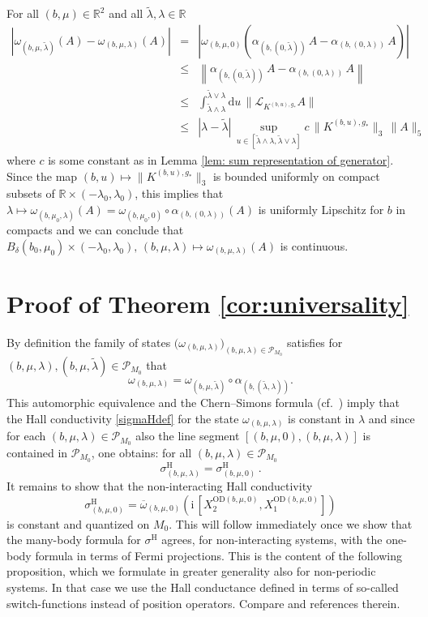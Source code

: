 \documentclass[a4paper]{article}
\newcommand{\D}{\mathrm{d}}
\renewcommand{\i}{\mathrm{i}}
\newcommand{\w}{\omega}
\newcommand{\R}{\mathbb{R}}
\newcommand{\OD}[1][]{   ^{\mathrm{OD}#1}   }
\newcommand{\mL}{\mathcal{L}}
\newcommand{\mP}{\mathcal{P}}
\theoremstyle{plain}
\theoremstyle{definition}
\theoremstyle{remark}
\renewcommand{\(}{\left(}
\renewcommand{\)}{\right)}
\begin{document}
For all $(b,\mu) \in \R^2$ and all $\tilde{\lambda}, \lambda \in \R$ 
\begin{eqnarray*}
|\w_{(b,\mu,\tilde \lambda)}(A)-  \w_{(b,\mu,\lambda)}(A)| &=&
\left|\w_{(b,\mu,0)}\left(\alpha_{(b,(0,\tilde \lambda))}\,A-\alpha_{(b,(0, \lambda))}\,A \right)\right|\\
&\leq& \left\|\alpha_{(b,(0,\tilde \lambda))}\,A-\alpha_{(b,(0,\lambda))}\,A\right\|\\
&\leq & \int_{\tilde\lambda\land \lambda}^{\tilde\lambda\lor \lambda} \D u\, \|\mL_{K^{(b,u),g_*}} A\|
\\
&\leq&
|\lambda-\tilde\lambda|\, \sup_{u\in [\tilde\lambda\land \lambda, \tilde\lambda\lor \lambda]} c\,\|K^{(b,u),g_*}\|_{3}\,\|A\|_{5}
\end{eqnarray*}
where $c$ is some constant as in Lemma \ref{lem: sum representation of generator}.
Since the map $(b,u)\mapsto \|K^{(b,u),g_*}\|_{3}$ is bounded uniformly on compact subsets of $\R\times (-\lambda_0,\lambda_0)$, this implies that $\lambda\mapsto \w_{(b,\mu_0,\lambda)}(A)= \w_{(b,\mu_0,0)}\circ \alpha_{(b,(0,\lambda))}(A)$ is uniformly Lipschitz for $b$ in compacts and we can conclude that  $B_\delta(b_0,\mu_0)\times (-\lambda_0,\lambda_0),\, (b,\mu,\lambda)\mapsto \w_{(b,\mu,\lambda)}(A)$ is continuous.
 

\section{Proof of Theorem \ref{cor:universality}} \label{sec:universality}
 
By definition the family of states $\big(\w_{(b,\mu,\lambda)}\big)_{(b,\mu,\lambda)\in\mathcal{P}_{M_0}}$ satisfies for $(b,\mu,\lambda),(b,\mu,\tilde{\lambda}) \in \mP_{M_0}$ that 
\[
    \w_{(b,\mu,\lambda)} = \w_{(b,\mu,\tilde{\lambda})} \circ \alpha_{(b,(\tilde{\lambda},\lambda))}.
\]
This automorphic equivalence and the Chern--Simons formula (cf.~\cite[Lemma~5.2 and Corollary~5.3]{WMMMT24}) imply that the Hall conductivity \eqref{sigmaHdef} for the state $\w_{(b,\mu,\lambda)}$ is constant in $\lambda$ and since for each $(b,\mu,\lambda)\in \mP_{M_0}$ also the line segment $[(b,\mu,0),(b,\mu,\lambda)]$ is contained in $\mP_{M_0}$, one obtains: for all $(b,\mu,\lambda)\in \mathcal{P}_{M_0}$
\[ \sigma^{\mathrm{H}}_{(b,\mu,\lambda)} = \sigma^{\mathrm{H}}_{(b,\mu,0)} \,.
\]
It remains to show that the non-interacting Hall conductivity 
\[
\sigma^{\mathrm{H}}_{(b,\mu,0)} =
\overline{\w}_{(b,\mu,0)} \left( \i \, \left[ X_2\OD[(b,\mu,0)], X_1\OD[(b,\mu,0)] \right] \right) 
\]
is constant  and  quantized on $M_0$.
This will follow immediately once we show that the many-body formula for $\sigma^\mathrm{H}$ agrees, for non-interacting systems, with the one-body formula in terms of Fermi projections.
This is the content of the following proposition, which we formulate in greater generality also for non-periodic systems. In that case  we use the  Hall conductance defined in terms of so-called switch-functions instead of position operators. Compare  \cite{TW2025} and references therein.
\end{document}
